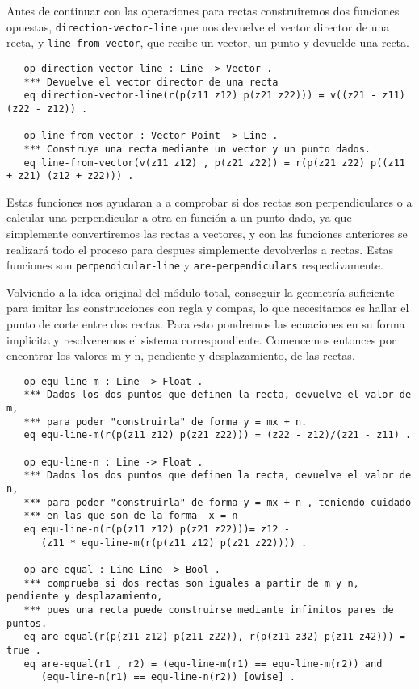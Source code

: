 Antes de continuar con las operaciones para rectas construiremos dos funciones opuestas, \texttt{direction-vector-line} que nos devuelve el vector director de una recta, y \texttt{line-from-vector}, que recibe un vector, un punto y devuelde una recta. \par
{\codesize
\begin{verbatim}
   op direction-vector-line : Line -> Vector .
   *** Devuelve el vector director de una recta
   eq direction-vector-line(r(p(z11 z12) p(z21 z22))) = v((z21 - z11) (z22 - z12)) .

   op line-from-vector : Vector Point -> Line .
   *** Construye una recta mediante un vector y un punto dados.
   eq line-from-vector(v(z11 z12) , p(z21 z22)) = r(p(z21 z22) p((z11 + z21) (z12 + z22))) .
\end{verbatim}
}

Estas funciones nos ayudaran a a comprobar si dos rectas son perpendiculares o a calcular una perpendicular a otra en función a un punto dado, ya que simplemente convertiremos las rectas a vectores, y con las funciones anteriores se realizará todo el proceso para despues simplemente devolverlas a rectas. Estas funciones son \texttt{perpendicular-line} y \texttt{are-perpendiculars} respectivamente.\par

Volviendo a la idea original del módulo total, conseguir la geometría suficiente para imitar las construcciones con regla y compas, lo que necesitamos es hallar el punto de corte entre dos rectas. Para esto pondremos las ecuaciones en su forma implicita y resolveremos el sistema correspondiente. Comencemos entonces por encontrar los valores m y n, pendiente y desplazamiento, de las rectas. \par

{\codesize
\begin{verbatim}
   op equ-line-m : Line -> Float .
   *** Dados los dos puntos que definen la recta, devuelve el valor de m, 
   *** para poder "construirla" de forma y = mx + n.
   eq equ-line-m(r(p(z11 z12) p(z21 z22))) = (z22 - z12)/(z21 - z11) .

   op equ-line-n : Line -> Float .
   *** Dados los dos puntos que definen la recta, devuelve el valor de n, 
   *** para poder "construirla" de forma y = mx + n , teniendo cuidado 
   *** en las que son de la forma  x = n
   eq equ-line-n(r(p(z11 z12) p(z21 z22)))= z12 - 
      (z11 * equ-line-m(r(p(z11 z12) p(z21 z22)))) .

   op are-equal : Line Line -> Bool .
   *** comprueba si dos rectas son iguales a partir de m y n, pendiente y desplazamiento, 
   *** pues una recta puede construirse mediante infinitos pares de puntos.
   eq are-equal(r(p(z11 z12) p(z11 z22)), r(p(z11 z32) p(z11 z42))) = true . 
   eq are-equal(r1 , r2) = (equ-line-m(r1) == equ-line-m(r2)) and 
      (equ-line-n(r1) == equ-line-n(r2)) [owise] .
\end{verbatim}
}

